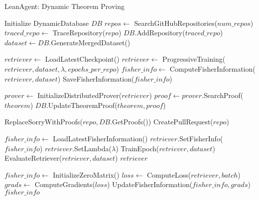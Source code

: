 \documentclass{article} %
\begin{document}
\begin{algorithm}
\caption{LeanAgent: Dynamic Theorem Proving}
\begin{algorithmic}[1]
    \State Initialize DynamicDatabase $DB$
    \State $repos \gets$ SearchGitHubRepositories($num\_repos$)
            \State $traced\_repo \gets$ TraceRepository($repo$)
            \State $DB$.AddRepository($traced\_repo$)
            \State $dataset \gets DB$.GenerateMergedDataset()
            
                \State $retriever \gets$ LoadLatestCheckpoint()
                \State $retriever \gets$ ProgressiveTraining($retriever, dataset, \lambda, epochs\_per\_repo$)
                \State $fisher\_info \gets$ ComputeFisherInformation($retriever, dataset$)
                \State SaveFisherInformation($fisher\_info$)
            \EndIf
            
            \State $prover \gets$ InitializeDistributedProver($retriever$)
                \State $proof \gets prover$.SearchProof($theorem$)
                    \State $DB$.UpdateTheoremProof($theorem, proof$)
                \EndIf
            \EndFor
            
            \State ReplaceSorryWithProofs($repo, DB$.GetProofs())
            \State CreatePullRequest($repo$)
        \EndIf
    \EndFor
\EndProcedure

    \State $fisher\_info \gets$ LoadLatestFisherInformation()
    \State $retriever$.SetFisherInfo($fisher\_info$)
    \State $retriever$.SetLambda($\lambda$)
        \State TrainEpoch($retriever, dataset$)
        \State EvaluateRetriever($retriever, dataset$)
    \EndFor
    \State \Return $retriever$
\EndProcedure

    \State $fisher\_info \gets$ InitializeZeroMatrix()
        \State $loss \gets$ ComputeLoss($retriever, batch$)
        \State $grads \gets$ ComputeGradients($loss$)
        \State UpdateFisherInformation($fisher\_info, grads$)
    \EndFor
    \State \Return $fisher\_info$
\EndProcedure
\end{algorithmic}
\end{algorithm}
\end{document}
